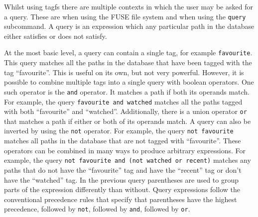Whilst using tagfs there are multiple contexts in which the user may be asked
for a query. These are when using the FUSE file system and when using the
\texttt{query} subcommand. A query is an expression which any particular path
in the database either satisfies or does not satisfy.

At the most basic level, a query can contain a single tag, for example
\texttt{favourite}. This query matches all the paths in the database that have
been tagged with the tag ``favourite''. This is useful on its own, but not very
powerful. However, it is possible to combine multiple tags into a single query
with boolean operators. One such operator is the \texttt{and} operator. It
matches a path if both its operands match. For example, the query
\texttt{favourite and watched} matches all the paths tagged with both
``favourite'' and ``watched''. Additionally, there is a union operator
\texttt{or} that matches a path if either or both of its operands match. A
query can also be inverted by using the \texttt{not} operator. For example, the
query \texttt{not favourite} matches all paths in the database that are not
tagged with ``favourite''. These operators can be combined in many ways to
produce arbitrary expressions. For example, the query \texttt{not favourite and
(not watched or recent)} matches any paths that do not have the ``favourite''
tag and have the ``recent'' tag or don't have the ``watched'' tag. In the
previous query parentheses are used to group parts of the expression
differently than without. Query expressions follow the conventional precedence
rules that specify that parentheses have the highest precedence, followed by
\texttt{not}, followed by \texttt{and}, followed by \texttt{or}.

